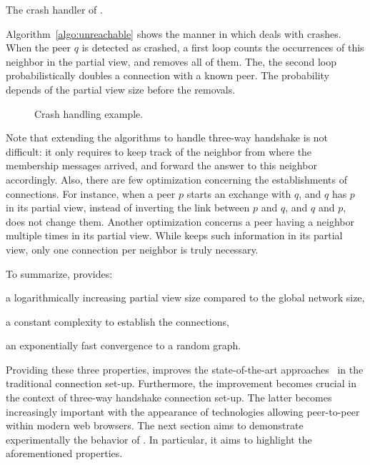 \begin{algorithm}
  
  \caption{\label{algo:unreachable}The crash handler of \SCAMPLON{}.}
\end{algorithm}

Algorithm~\ref{algo:unreachable} shows the manner in which \SCAMPLON{} deals
with crashes. When the peer $q$ is detected as crashed, a first loop counts the
occurrences of this neighbor in the partial view, and removes all of them. The,
the second loop probabilistically doubles a connection with a known peer. The
probability depends of the partial view size before the removals.

\begin{figure}
  
  \caption{\label{fig:crashexample}Crash handling example.}
\end{figure}

Note that extending the algorithms to handle three-way handshake is not
difficult: it only requires to keep track of the neighbor from where the
membership messages arrived, and forward the answer to this neighbor
accordingly. Also, there are few optimization concerning the establishments of
connections. For instance, when a peer $p$ starts an exchange with $q$, and $q$
has $p$ in its partial view, instead of inverting the link between $p$ and $q$,
and $q$ and $p$, \SCAMPLON{} does not change them. Another optimization
concerns a peer having a neighbor multiple times in its partial view. While
\SCAMPLON{} keeps such information in its partial view, only one connection per
neighbor is truly necessary.

To summarize, \SCAMPLON{} provides:
\begin{inparaenum}[(i)]
\item a logarithmically increasing partial view size compared to the global
  network size,
\item a constant complexity to establish the connections,
\item an exponentially fast convergence to a random graph.
\end{inparaenum}
Providing these three properties, \SCAMPLON{} improves the state-of-the-art
approaches~\cite{ganesh2001scamp,voulgaris2005cyclon} in the traditional
connection set-up. Furthermore, the improvement becomes crucial in the context
of three-way handshake connection set-up.  The latter becomes increasingly
important with the appearance of technologies allowing peer-to-peer within
modern web browsers.  The next section aims to demonstrate experimentally the
behavior of \SCAMPLON{}. In particular, it aims to highlight the aforementioned
properties.


